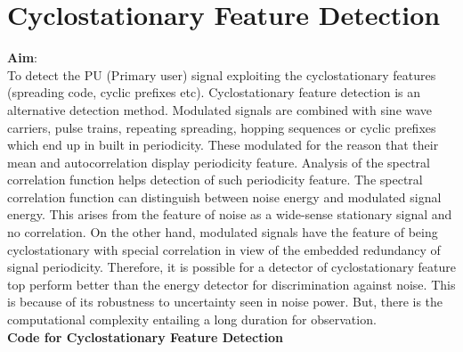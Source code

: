 \documentclass[a4paper]{article}
\begin{document}
\section{Cyclostationary Feature Detection}
\textbf{\large{Aim}}:\\[10pt]
To detect the PU (Primary user) signal exploiting the cyclostationary features
(spreading code, cyclic prefixes etc). Cyclostationary feature detection is
an alternative detection method. Modulated signals are combined with sine
wave carriers, pulse trains, repeating spreading, hopping sequences or cyclic
prefixes which end up in built in periodicity. These modulated for the reason
that their mean and autocorrelation display periodicity feature. Analysis of
the spectral correlation function helps detection of such periodicity feature.
The spectral correlation function can distinguish between noise energy and
modulated signal energy. This arises from the feature of noise as a wide-sense
stationary signal and no correlation. On the other hand, modulated signals
have the feature of being cyclostationary with special correlation in view of
the embedded redundancy of signal periodicity. Therefore, it is possible for a
detector of cyclostationary feature top perform better than the energy detector
for discrimination against noise. This is because of its robustness to uncertainty
seen in noise power. But, there is the computational complexity entailing a
long duration for observation.\\[10pt]
\textbf{Code for Cyclostationary Feature Detection}\\
\end{document}
